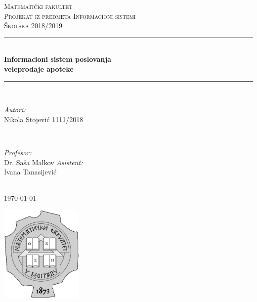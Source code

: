 \documentclass[12pt]{article}
\begin{document}
\newpage

\begin{titlepage}

\newcommand{\HRule}{\rule{\linewidth}{0.5mm}}

\center 

\textsc{\LARGE Matematički fakultet}\\[1.5cm] 
\textsc{\Large Projekat iz predmeta Informacioni sistemi}\\[0.5cm] 
\textsc{\large Školska 2018/2019}\\[0.5cm]



\HRule \\[0.4cm]
{ \huge \bfseries Informacioni sistem poslovanja \\[0.2cm]veleprodaje apoteke}\\[0.4cm] 
\HRule \\[1.5cm]

\begin{minipage}{0.5\textwidth}
\begin{flushleft} \large
\emph{Autori:}\\
Nikola Stojević 1111/2018 \break
\end{flushleft}
\end{minipage}
~
\begin{minipage}{0.4\textwidth}
\begin{flushright} \large
\emph{Profesor:} \\
Dr. Saša Malkov 
\emph{Asistent:} \\
Ivana Tanasijević
\end{flushright}
\end{minipage}\\[1cm]

{\large \today}

\includegraphics[width=40mm]{slike/logo.jpg}\\[1cm] 
\vfill

\end{titlepage}

\renewcommand*\contentsname{Sadržaj}
\tableofcontents

\newpage


\end{document}
